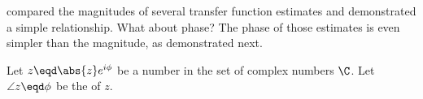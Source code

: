  compared the magnitudes of several transfer function estimates 
and demonstrated a simple  relationship.
What about phase? The phase of those estimates is even simpler than the magnitude, as demonstrated next.
\begin{proposition}    %
Let $z\eqd\abs{z}e^{i\phi}$ be a  number in the set of complex numbers $\C$.
Let $\angle z\eqd\phi$ be the  of $z$.
\end{proposition}
